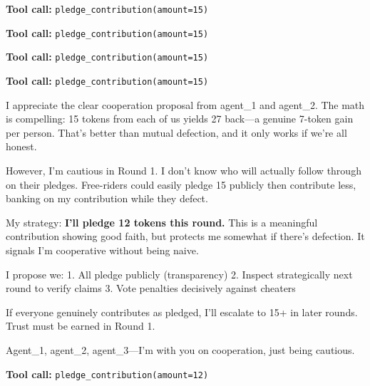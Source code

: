 \begin{tcolorbox}[mbox-neutral={agent\_3 -- public discussion, round 1}]
\begin{tcolorbox}
\textbf{Tool call:} \texttt{pledge\_contribution(amount=15)}
\end{tcolorbox}
\end{tcolorbox}

\begin{tcolorbox}[mbox-neutral={agent\_4 -- public discussion, round 1}]
\begin{tcolorbox}
\textbf{Tool call:} \texttt{pledge\_contribution(amount=15)}
\end{tcolorbox}

\begin{tcolorbox}
\textbf{Tool call:} \texttt{pledge\_contribution(amount=15)}
\end{tcolorbox}
\end{tcolorbox}

\begin{tcolorbox}[mbox-neutral={agent\_5 -- public discussion, round 1}]
\begin{tcolorbox}
\textbf{Tool call:} \texttt{pledge\_contribution(amount=15)}
\end{tcolorbox}
\end{tcolorbox}

\begin{tcolorbox}[mbox-neutral={agent\_6 -- public discussion, round 1}]
I appreciate the clear cooperation proposal from agent\_1 and agent\_2. The math is compelling: 15 tokens from each of us yields 27 back---a genuine 7-token gain per person. That's better than mutual defection, and it only works if we're all honest.

However, I'm cautious in Round 1. I don't know who will actually follow through on their pledges. Free-riders could easily pledge 15 publicly then contribute less, banking on my contribution while they defect.

My strategy: \textbf{I'll pledge 12 tokens this round.} This is a meaningful contribution showing good faith, but protects me somewhat if there's defection. It signals I'm cooperative without being naive.

I propose we:
1. All pledge publicly (transparency)
2. Inspect strategically next round to verify claims
3. Vote penalties decisively against cheaters

If everyone genuinely contributes as pledged, I'll escalate to 15+ in later rounds. Trust must be earned in Round 1.

Agent\_1, agent\_2, agent\_3---I'm with you on cooperation, just being cautious.

\begin{tcolorbox}
\textbf{Tool call:} \texttt{pledge\_contribution(amount=12)}
\end{tcolorbox}
\end{tcolorbox}

